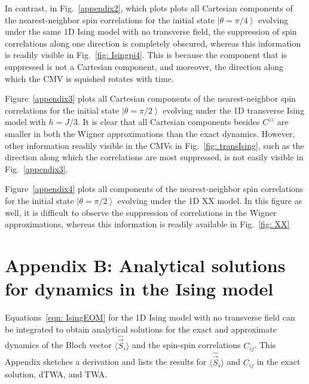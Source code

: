\documentclass[pra,reprint,superscriptaddress]{revtex4-1}
\newcommand{\ket}[1]{\left| #1 \right\rangle}
\newcommand{\smallexpect}[1]{\langle #1 \rangle}
\begin{document}
In contrast, in Fig.~\ref{appendix2}, which plots plots all Cartesian components of the nearest-neighbor spin correlations for the initial state $\ket{\theta=\pi/4}$ evolving under the same 1D Ising model with no transverse field, the suppression of spin correlations along one direction is completely obscured, whereas this information is readily visible in Fig.~\ref{fig: Isingpi4}. This is because the component that is suppressed is not a Cartesian component, and moreover, the direction along which the CMV is squished rotates with time.

Figure~\ref{appendix3} plots all Cartesian components of the nearest-neighbor spin correlations for the initial state $\ket{\theta=\pi/2}$ evolving under the 1D transverse Ising model with $h=J/3$. It is clear that all Cartesian components besides $C^{zz}$ are smaller in both the Wigner approximations than the exact dynamics. However, other information readily visible in the CMVs in Fig.~\ref{fig: transIsing}, such as the direction along which the correlations are most suppressed, is not easily visible in Fig.~\ref{appendix3}.

Figure~\ref{appendix4} plots all components of the nearest-neighbor spin correlations for the initial state $\ket{\theta=\pi/2}$ evolving under the 1D XX model. In this figure as well, it is difficult to observe the suppression of correlations in the Wigner approximations, whereas this information is readily available in Fig.~\ref{fig: XX}

\section*{Appendix B: Analytical solutions for dynamics in the Ising model}\label{sec: analytical_expns}
Equations~\eqref{eqn: IsingEOM} for the 1D Ising model with no transverse field can be integrated to obtain analytical solutions for the exact and approximate dynamics of the Bloch vector $\smallexpect{\hat{\vec{S}}_i}$ and the spin-spin correlations $C_{ij}$. This Appendix sketches a derivation and lists the results for $\smallexpect{\hat{\vec{S}}_i}$ and $C_{ij}$ in the exact solution, dTWA, and TWA.
\end{document}
